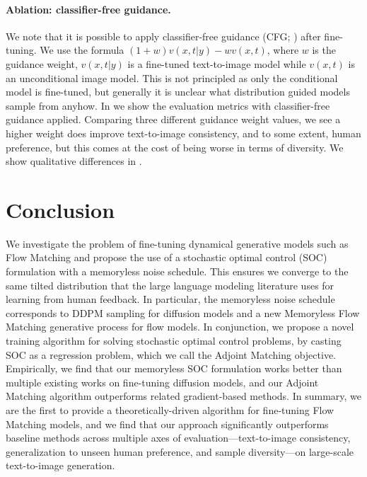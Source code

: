 \documentclass[]{fairmeta}
\let\oldaddcontentsline\addcontentsline
\newcommand{\starttocentries}{\let\addcontentsline\oldaddcontentsline}
\begin{document}
\paragraph{Ablation: classifier-free guidance.} We note that it is possible to apply classifier-free guidance (CFG; \citet{ho2022classifier,zheng2023guided}) after fine-tuning. We use the formula $(1+w) v(x, t | y) - w v(x, t)$, where $w$ is the guidance weight, $v(x, t | y)$ is a fine-tuned text-to-image model while $v(x, t)$ is an unconditional image model.
This is not principled as only the conditional model is fine-tuned, but generally it is unclear what distribution guided models sample from anyhow. 
In  we show the evaluation metrics with classifier-free guidance applied. Comparing three different guidance weight values, we see a higher weight does improve text-to-image consistency, and to some extent, human preference, but this comes at the cost of being worse in terms of diversity. We show qualitative differences in .

\section{Conclusion}
\label{sec:conclusion}

We investigate the problem of fine-tuning dynamical generative models such as Flow Matching and propose the use of a stochastic optimal control (SOC) formulation with a memoryless noise schedule. 
This ensures we converge to the same tilted distribution that the large language modeling literature uses for learning from human feedback. 
In particular, the memoryless noise schedule corresponds to DDPM sampling for diffusion models and a new Memoryless Flow Matching generative process for flow models. 
In conjunction, we propose a novel training algorithm for solving stochastic optimal control problems, by casting SOC as a regression problem, which we call the Adjoint Matching objective. 
Empirically, we find that our memoryless SOC formulation works better than multiple existing works on fine-tuning diffusion models, and our Adjoint Matching algorithm outperforms related gradient-based methods.
In summary, we are the first to provide a theoretically-driven algorithm for fine-tuning Flow Matching models, and we find that our approach significantly outperforms baseline methods across multiple axes of evaluation---text-to-image consistency, generalization to unseen human preference, and sample diversity---on large-scale text-to-image generation.




\clearpage
\newpage
\beginappendix

\tableofcontents

\starttocentries

\clearpage
\newpage



\clearpage
\newpage


\end{document}
